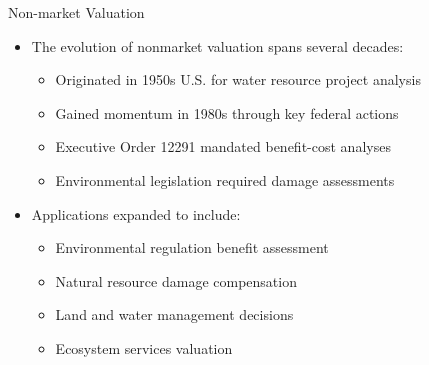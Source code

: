 \documentclass[
  ignorenonframetext,
]{beamer}
\providecommand{\tightlist}{%
  \setlength{\itemsep}{0pt}\setlength{\parskip}{0pt}}\usepackage{longtable,booktabs,array}
\begin{document}
\begin{frame}{Non-market Valuation}
\label{non-market-valuation}
\begin{itemize}
\tightlist
\item
  The evolution of nonmarket valuation spans several decades:

  \begin{itemize}
  \tightlist
  \item
    Originated in 1950s U.S. for water resource project analysis
  \item
    Gained momentum in 1980s through key federal actions
  \item
    Executive Order 12291 mandated benefit-cost analyses
  \item
    Environmental legislation required damage assessments
  \end{itemize}
\item
  Applications expanded to include:

  \begin{itemize}
  \tightlist
  \item
    Environmental regulation benefit assessment
  \item
    Natural resource damage compensation
  \item
    Land and water management decisions
  \item
    Ecosystem services valuation
  \end{itemize}
\end{itemize}
\end{frame}
\end{document}
